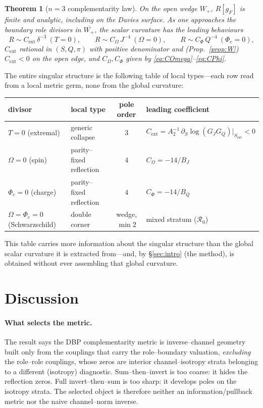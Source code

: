 \documentclass[11pt]{article}
\newtheorem{theorem}{Theorem}
\newcommand{\Wp}{W_{+}}
\newcommand{\Rext}{C_{\mathrm{ext}}}
\newcommand{\Rc}{\mathcal R_0}
\newcommand{\Sext}{S_{\mathrm{ext}}}
\begin{document}
\begin{theorem}[$n=3$ complementarity law]
\label{thm:law}
On the open wedge $\Wp$, $R[g_F]$ is finite and analytic, including on the Davies surface. As
one approaches the boundary role divisors in $\overline{\Wp}$, the scalar curvature has the
leading behaviours
\[
R\sim \Rext\,\delta^{-3}\ (T=0),\qquad
R\sim C_\Omega\,J^{-4}\ (\Omega=0),\qquad
R\sim C_\Phi\,Q^{-4}\ (\Phi_e=0),
\]
$\Rext$ rational in $(S,Q,\pi)$ with positive denominator and (Prop.~\ref{prop:W}) $\Rext<0$
on the open edge, and $C_\Omega,C_\Phi$ given by \eqref{eq:COmega}--\eqref{eq:CPhi}.
\end{theorem}

The entire singular structure is the following table of local types---each row read from a local
metric germ, none from the global curvature:
\begin{center}
\begin{tabular}{llcl}
\hline
divisor & local type & pole order & leading coefficient\\
\hline
$T=0$ (extremal) & generic collapse & $3$ &
  $\Rext=A_2^{-1}\,\partial_S\log(G_JG_Q)|_{\Sext}<0$\\
$\Omega=0$ (spin) & parity--fixed reflection & $4$ & $C_\Omega=-14/B_J$\\
$\Phi_e=0$ (charge) & parity--fixed reflection & $4$ & $C_\Phi=-14/B_Q$\\
$\Omega=\Phi_e=0$ (Schwarzschild) & double corner & wedge, $\min 2$ & mixed stratum ($\Rc$)\\
\hline
\end{tabular}
\end{center}
This table carries more information about the singular structure than the global scalar
curvature it is extracted from---and, by \S\ref{sec:intro} (the method), is obtained without ever
assembling that global curvature.

\section{Discussion}
\label{sec:discussion}

\paragraph{What selects the metric.}
The result says the DBP complementarity metric is inverse--channel geometry built only from the
couplings that carry the role--boundary valuation, \emph{excluding} the role--role couplings,
whose zeros are interior channel--isotropy strata belonging to a different (isotropy)
diagnostic. Sum--then--invert is too coarse: it hides the reflection zeros. Full
invert--then--sum is too sharp: it develops poles on the isotropy strata. The selected object is
therefore neither an information/pullback metric nor the naive channel--norm inverse.
\end{document}
